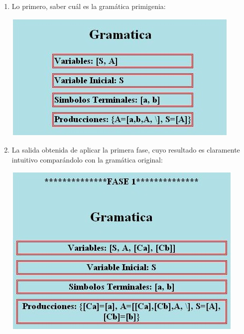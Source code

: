 \documentclass[12pt,a4paper,spanish]{book}
\begin{document}
\begin{enumerate}
\item Lo primero, saber cu\'al es la gram\'atica primigenia:\\
\begin{center}
\includegraphics[scale=0.95]{chom2.jpg}
\end{center}
\item La salida obtenida de aplicar la primera fase, cuyo resultado es claramente intuitivo compar\'andolo con la gram\'atica original:\\
\begin{center}
\includegraphics{chom3.jpg}
\end{center}


\end{enumerate}
\end{document}
